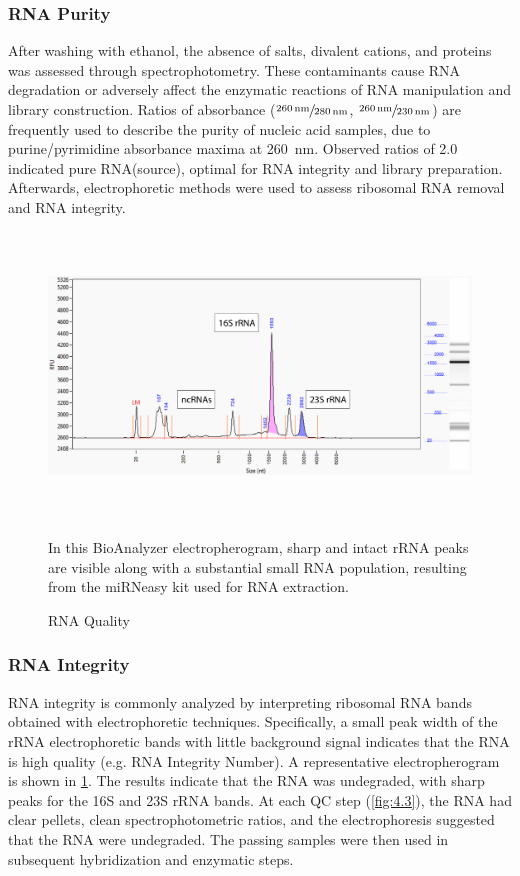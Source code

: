 \subsubsection{RNA Purity}
After washing with ethanol, the absence of salts, divalent cations, and proteins was assessed through spectrophotometry. These contaminants cause RNA degradation or adversely affect the enzymatic reactions of RNA manipulation and library construction. Ratios of absorbance ($\sfrac{\SI{260}{\nano\meter}}{\SI{280}{\nano\meter}}$, $\sfrac{\SI{260}{\nano\meter}}{\SI{230}{\nano\meter}}$) are frequently used to describe the purity of nucleic acid samples, due to purine/pyrimidine absorbance maxima at \SI{260}{\nano\meter}. Observed ratios of 2.0 indicated pure RNA(source), optimal for RNA integrity and library preparation. Afterwards, electrophoretic methods were used to assess ribosomal RNA removal and RNA integrity.

\begin{figure}
\includegraphics[width=\textwidth,height=3in]{images/Sequencing/RNA-integrity.png}
\caption{RNA Quality}\label{fig:4.2}
In this BioAnalyzer electropherogram, sharp and intact rRNA peaks are visible along with a substantial small RNA population, resulting from the miRNeasy kit used for RNA extraction.
\end{figure}

\subsubsection{RNA Integrity}
RNA integrity is commonly analyzed by interpreting ribosomal RNA bands obtained with electrophoretic techniques. Specifically, a small peak width of the rRNA electrophoretic bands with little background signal indicates that the RNA is high quality (e.g. RNA Integrity Number). A representative electropherogram is shown in \ref{fig:4.2}. The results indicate that the RNA was undegraded, with sharp peaks for the 16S and 23S rRNA bands. At each QC step (\ref{fig:4.3}), the RNA had clear pellets, clean spectrophotometric ratios, and the electrophoresis suggested that the RNA were undegraded. The passing samples were then used in subsequent hybridization and enzymatic steps.

